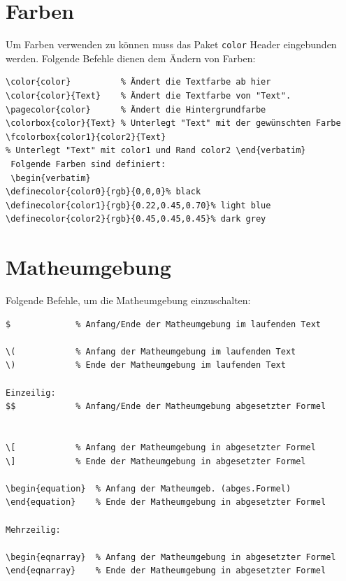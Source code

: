 \documentclass{like}
\begin{document}
\section{Farben}
Um Farben verwenden zu können muss das Paket \verb+color+ Header eingebunden werden. 
Folgende Befehle dienen dem Ändern von Farben: \nopagebreak\par\medskip\nopagebreak
\begin{minipage}{0.8\textwidth}
\begin{verbatim}
\color{color}          % Ändert die Textfarbe ab hier
\color{color}{Text}    % Ändert die Textfarbe von "Text".
\pagecolor{color}      % Ändert die Hintergrundfarbe
\colorbox{color}{Text} % Unterlegt "Text" mit der gewünschten Farbe
\fcolorbox{color1}{color2}{Text} 
% Unterlegt "Text" mit color1 und Rand color2 \end{verbatim}
 Folgende Farben sind definiert:
 \begin{verbatim}
\definecolor{color0}{rgb}{0,0,0}% black
\definecolor{color1}{rgb}{0.22,0.45,0.70}% light blue
\definecolor{color2}{rgb}{0.45,0.45,0.45}% dark grey

\end{verbatim}
\end{minipage}\par\bigskip




\section{Matheumgebung}

Folgende Befehle, um die Matheumgebung einzuschalten:\nopagebreak\par\medskip\nopagebreak

\begin{minipage}{0.8\textwidth}
\begin{verbatim}
$             % Anfang/Ende der Matheumgebung im laufenden Text

\(            % Anfang der Matheumgebung im laufenden Text
\)            % Ende der Matheumgebung im laufenden Text

Einzeilig:
$$            % Anfang/Ende der Matheumgebung abgesetzter Formel 
				

\[            % Anfang der Matheumgebung in abgesetzter Formel 
\]            % Ende der Matheumgebung in abgesetzter Formel 

\begin{equation}  % Anfang der Matheumgeb. (abges.Formel)
\end{equation}    % Ende der Matheumgebung in abgesetzter Formel 

Mehrzeilig:

\begin{eqnarray}  % Anfang der Matheumgebung in abgesetzter Formel
\end{eqnarray}    % Ende der Matheumgebung in abgesetzter Formel
\end{verbatim}
\end{minipage}\par\bigskip
\end{document}
